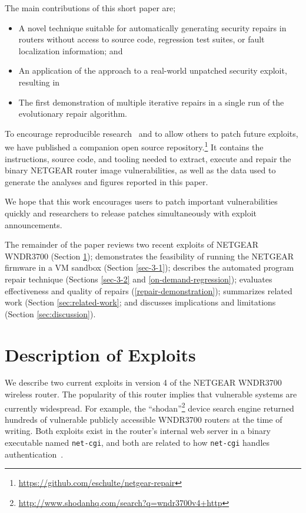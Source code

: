 \documentclass{sigcomm-alternate}
\begin{document}
The main  contributions of this short paper are;
\begin{itemize}
\item A novel technique suitable for automatically generating security
  repairs in routers without access to source code, regression test suites, or fault
localization information; and
\item An application of the approach to a real-world unpatched
security exploit, resulting in
\item The first demonstration of multiple iterative repairs in a single
run of the evolutionary repair algorithm.
\end{itemize}

To encourage reproducible
research~\cite{buckheit1995wavelab,mesirov2010accessible} and to allow
others to patch
future exploits, we have published a companion open source
repository.\footnote{\url{https://github.com/eschulte/netgear-repair}}
It contains the instructions, source
code, and tooling needed to extract, execute and repair the binary
NETGEAR router image vulnerabilities, as well as the data used to
generate the
analyses and figures reported  in this paper.

We hope that this work encourages users to patch important
vulnerabilities quickly and researchers to release patches
simultaneously with exploit announcements.

The remainder of the paper reviews two recent exploits of NETGEAR
WNDR3700 (Section \ref{sec-2}); demonstrates the feasibility of
running the NETGEAR firmware in a VM sandbox (Section \ref{sec-3-1});
describes the automated program repair technique (Sections
\ref{sec-3-2} and \ref{on-demand-regression}); evaluates effectiveness
and quality of repairs (\ref{repair-demonstration}); summarizes
related work (Section \ref{sec:related-work}; and discusses
implications and limitations (Section \ref{sec:discussion}).


\section{Description of Exploits}
\label{sec-2}
We describe two current exploits in version 4 of the NETGEAR WNDR3700
wireless router. The popularity of this router implies that vulnerable
systems are currently widespread. For example, the
``shodan''\footnote{\url{http://www.shodanhq.com/search?q=wndr3700v4+http}}
device search engine returned hundreds of vulnerable publicly
accessible WNDR3700 routers at the time of writing.  Both exploits
exist in the router's internal web server in a binary executable named
\texttt{net-cgi}, and both are related to how \texttt{net-cgi} handles
authentication~\cite{zcutlip}.
\end{document}
